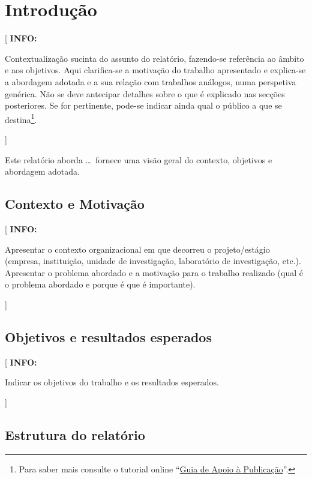 \documentclass[11pt,a4paper]{report}
\newenvironment{info}[1]{\vspace*{6mm}\color{blue}[ \textbf{INFO:} \begin{em} #1}{\vspace*{3mm}\end{em} ]}
\begin{document}

\chapter{Introdução}

\pagestyle{fancy}
\setcounter{page}{1}

\begin{info}
Contextualização sucinta do assunto do relatório, fazendo-se
referência ao âmbito e aos objetivos.
Aqui clarifica-se a motivação do trabalho apresentado e explica-se a
abordagem adotada e a sua relação com trabalhos análogos, numa
perspetiva genérica.
Não se deve antecipar detalhes sobre o que é explicado nas secções
posteriores. 
Se for pertinente, pode-se indicar ainda qual o público a que se
destina\footnote{%
Para saber mais consulte o tutorial online 
``\href{https://docs.google.com/document/d/1TDC1behVq8x7fQL4CcPEEh_np5GXviJevQxnQ9gbiJs/edit}
{Guia de Apoio à Publicação}''.}.
\end{info}

Este relatório aborda \ldots\ fornece uma visão geral do contexto, objetivos e abordagem adotada.

\section{Contexto e Motivação}

\begin{info}
   Apresentar o contexto organizacional em que decorreu o projeto/estágio (empresa, instituição, unidade de investigação, laboratório de investigação, etc.). 
   Apresentar o problema abordado e a motivação para o trabalho realizado (qual é o problema abordado e porque é que é importante).
\end{info}

\section{Objetivos e resultados esperados}

\begin{info}
  Indicar os objetivos do trabalho e os resultados esperados.
\end{info}

\section{Estrutura do relatório}
	
\end{document}
